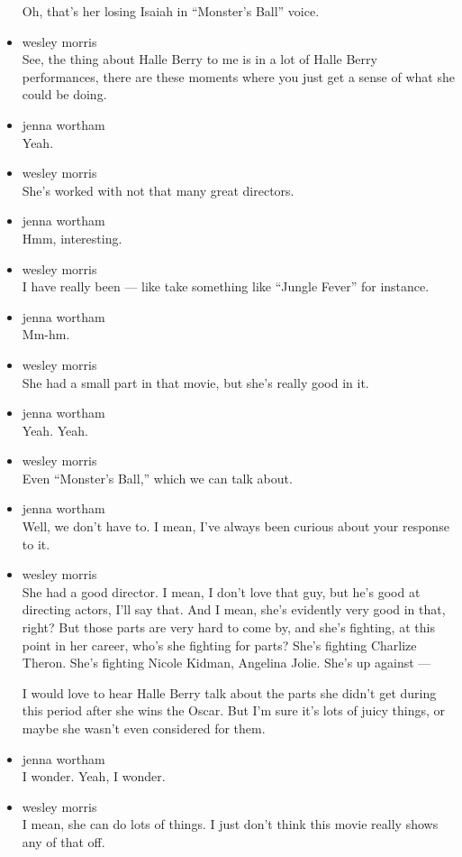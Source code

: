 \begin{itemize}
  Oh, that's her losing Isaiah in ``Monster's Ball'' voice.
\item
  wesley morris\\
  See, the thing about Halle Berry to me is in a lot of Halle Berry
  performances, there are these moments where you just get a sense of
  what she could be doing.
\item
  jenna wortham\\
  Yeah.
\item
  wesley morris\\
  She's worked with not that many great directors.
\item
  jenna wortham\\
  Hmm, interesting.
\item
  wesley morris\\
  I have really been --- like take something like ``Jungle Fever'' for
  instance.
\item
  jenna wortham\\
  Mm-hm.
\item
  wesley morris\\
  She had a small part in that movie, but she's really good in it.
\item
  jenna wortham\\
  Yeah. Yeah.
\item
  wesley morris\\
  Even ``Monster's Ball,'' which we can talk about.
\item
  jenna wortham\\
  Well, we don't have to. I mean, I've always been curious about your
  response to it.
\item
  wesley morris\\
  She had a good director. I mean, I don't love that guy, but he's good
  at directing actors, I'll say that. And I mean, she's evidently very
  good in that, right? But those parts are very hard to come by, and
  she's fighting, at this point in her career, who's she fighting for
  parts? She's fighting Charlize Theron. She's fighting Nicole Kidman,
  Angelina Jolie. She's up against ---

  I would love to hear Halle Berry talk about the parts she didn't get
  during this period after she wins the Oscar. But I'm sure it's lots of
  juicy things, or maybe she wasn't even considered for them.
\item
  jenna wortham\\
  I wonder. Yeah, I wonder.
\item
  wesley morris\\
  I mean, she can do lots of things. I just don't think this movie
  really shows any of that off.


\end{itemize}
